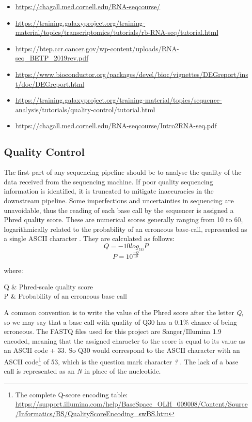 \begin{itemize}\itemsep-0.5em
\item \url{https://chagall.med.cornell.edu/RNA-seqcourse/}
\item \url{https://training.galaxyproject.org/training-material/topics/transcriptomics/tutorials/rb-RNA-seq/tutorial.html}
\item \url{https://btep.ccr.cancer.gov/wp-content/uploads/RNA-seq_BETP_2019rev.pdf}
\item \url{https://www.bioconductor.org/packages/devel/bioc/vignettes/DEGreport/inst/doc/DEGreport.html}
\item \url{https://training.galaxyproject.org/training-material/topics/sequence-analysis/tutorials/quality-control/tutorial.html}
\item \url{https://chagall.med.cornell.edu/RNA-seqcourse/Intro2RNA-seq.pdf}
\end{itemize}


\subsection{Quality Control}

The first part of any sequencing pipeline should be to analyse the quality of the data received from the sequencing machine. If poor quality sequencing information is identified, it is truncated to mitigate inaccuracies in the downstream pipeline. Some imperfections and uncertainties in sequencing are unavoidable, thus the reading of each base call by the sequencer is assigned a Phred quality score. These are numerical scores generally ranging from 10 to 60, logarithmically related to the probability of an erroneous base-call, represented as a single ASCII character \citep{ewing1998base}. They are calculated as follows:
$$ Q = -10 log_{10}P $$
 $$P = 10^{\frac{-Q}{10}}$$
 
where:
\begin{conditionsenv*}
	Q 		& Phred-scale quality score \\
	P 		& Probability of an erroneous base call \\
\end{conditionsenv*}

A common convention is to write the value of the Phred score after the letter \textit{Q}, so we may say that a base call with quality of Q30 has a 0.1\% chance of being erroneous. The FASTQ files used for this project are Sanger/Illumina 1.9 encoded, meaning that the assigned character to the score is equal to its value as an ASCII code + 33. So Q30 would correspond to the ASCII character with an ASCII code\footnote{The complete Q-score encoding table: \url{https://support.illumina.com/help/BaseSpace_OLH_009008/Content/Source/Informatics/BS/QualityScoreEncoding_swBS.htm}} of 53, which is the question mark character \textit{?} \citep{ewing1998base}. The lack of a base call is represented as an \textit{N} in place of the nucleotide.

